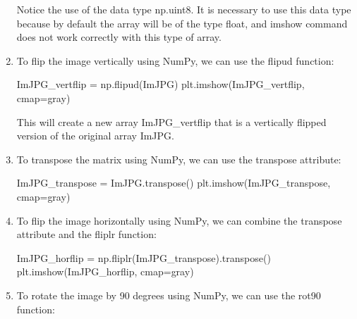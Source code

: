 \documentclass[11pt]{article}
\newenvironment{Shaded}{}{}
\newcommand{\StringTok}[1]{\textcolor[rgb]{0.25,0.44,0.63}{{#1}}}
\newcommand{\NormalTok}[1]{{#1}}
\newcommand{\OperatorTok}[1]{\textcolor[rgb]{0.40,0.40,0.40}{{#1}}}
\begin{document}
\begin{enumerate}
  Notice the use of the data type np.uint8. It is necessary to use this
  data type because by default the array will be of the type float, and
  imshow command does not work correctly with this type of array.
\item
  To flip the image vertically using NumPy, we can use the flipud
  function:

\begin{Shaded}
\begin{tcolorbox}[breakable, size=fbox, boxrule=1pt, pad at break*=1mm,colback=cellbackground, colframe=cellborder]
  \begin{Highlighting}[]
\NormalTok{ImJPG\_vertflip }\OperatorTok{=}\NormalTok{ np.flipud(ImJPG)}
\NormalTok{plt.imshow(ImJPG\_vertflip, cmap}\OperatorTok{=}\StringTok{\textquotesingle{}gray\textquotesingle{}}\NormalTok{)}
\end{Highlighting}
\end{tcolorbox}
\end{Shaded}

  This will create a new array ImJPG\_vertflip that is a vertically
  flipped version of the original array ImJPG.
\item
  To transpose the matrix using NumPy, we can use the transpose
  attribute:

\begin{Shaded}
\begin{tcolorbox}[breakable, size=fbox, boxrule=1pt, pad at break*=1mm,colback=cellbackground, colframe=cellborder]
  \begin{Highlighting}[]
\NormalTok{ImJPG\_transpose }\OperatorTok{=}\NormalTok{ ImJPG.transpose()}
\NormalTok{plt.imshow(ImJPG\_transpose, cmap}\OperatorTok{=}\StringTok{\textquotesingle{}gray\textquotesingle{}}\NormalTok{)}
\end{Highlighting}
\end{tcolorbox}
\end{Shaded}
\item
  To flip the image horizontally using NumPy, we can combine the
  transpose attribute and the fliplr function:

\begin{Shaded}
\begin{tcolorbox}[breakable, size=fbox, boxrule=1pt, pad at break*=1mm,colback=cellbackground, colframe=cellborder]
  \begin{Highlighting}[]
\NormalTok{ImJPG\_horflip }\OperatorTok{=}\NormalTok{ np.fliplr(ImJPG\_transpose).transpose()}
\NormalTok{plt.imshow(ImJPG\_horflip, cmap}\OperatorTok{=}\StringTok{\textquotesingle{}gray\textquotesingle{}}\NormalTok{)}
\end{Highlighting}
\end{tcolorbox}
\end{Shaded}
\item
  To rotate the image by 90 degrees using NumPy, we can use the rot90
  function:


\end{enumerate}
\end{document}
